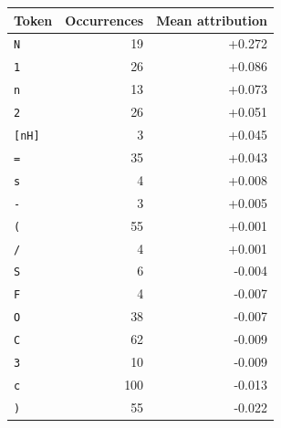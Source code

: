 \begin{tabular}{lrr}
\toprule
Token & Occurrences & Mean attribution \\
\midrule
\texttt{N} & 19 & +0.272 \\
\texttt{1} & 26 & +0.086 \\
\texttt{n} & 13 & +0.073 \\
\texttt{2} & 26 & +0.051 \\
\texttt{[nH]} & 3 & +0.045 \\
\texttt{=} & 35 & +0.043 \\
\texttt{s} & 4 & +0.008 \\
\texttt{-} & 3 & +0.005 \\
\texttt{(} & 55 & +0.001 \\
\texttt{/} & 4 & +0.001 \\
\texttt{S} & 6 & -0.004 \\
\texttt{F} & 4 & -0.007 \\
\texttt{O} & 38 & -0.007 \\
\texttt{C} & 62 & -0.009 \\
\texttt{3} & 10 & -0.009 \\
\texttt{c} & 100 & -0.013 \\
\texttt{)} & 55 & -0.022 \\
\bottomrule
\end{tabular}